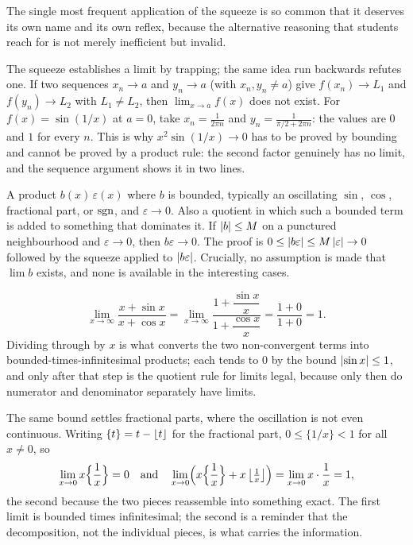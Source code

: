 The single most frequent application of the squeeze is so common that it deserves its own name and its own reflex, because the alternative reasoning that students reach for is not merely inefficient but invalid.

\begin{keynote}
The squeeze establishes a limit by trapping; the same idea run backwards refutes one. If two sequences $x_{n}\to a$ and $y_{n}\to a$ (with $x_{n},y_{n}\neq a$) give $f(x_{n})\to L_{1}$ and $f(y_{n})\to L_{2}$ with $L_{1}\neq L_{2}$, then $\lim_{x\to a}f(x)$ does not exist. For $f(x)=\sin(1/x)$ at $a=0$, take $x_{n}=\tfrac{1}{2\pi n}$ and $y_{n}=\tfrac{1}{\pi/2+2\pi n}$: the values are $0$ and $1$ for every $n$. This is why $x^{2}\sin(1/x)\to0$ has to be proved by bounding and cannot be proved by a product rule: the second factor genuinely has no limit, and the sequence argument shows it in two lines.
\end{keynote}

\cue A product $b(x)\,\varepsilon(x)$ where $b$ is bounded, typically an oscillating $\sin$, $\cos$, fractional part, or $\operatorname{sgn}$, and $\varepsilon\to0$. Also a quotient in which such a bounded term is added to something that dominates it.
\method If $\left\lvert b\right\rvert\leq M$ on a punctured neighbourhood and $\varepsilon\to0$, then $b\varepsilon\to0$. The proof is $0\leq\left\lvert b\varepsilon\right\rvert\leq M\left\lvert \varepsilon\right\rvert\to0$ followed by the squeeze applied to $\left\lvert b\varepsilon\right\rvert$. Crucially, no assumption is made that $\lim b$ exists, and none is available in the interesting cases.

\begin{worked}
\[\lim_{x\to\infty}\frac{x+\sin x}{x+\cos x}=\lim_{x\to\infty}\frac{1+\dfrac{\sin x}{x}}{1+\dfrac{\cos x}{x}}=\frac{1+0}{1+0}=1 .\]
Dividing through by $x$ is what converts the two non-convergent terms into bounded-times-infinitesimal products; each tends to $0$ by the bound $\left\lvert \sin x\right\rvert\leq1$, and only after that step is the quotient rule for limits legal, because only then do numerator and denominator separately have limits.

The same bound settles fractional parts, where the oscillation is not even continuous. Writing $\{t\}=t-\left\lfloor t\right\rfloor$ for the fractional part, $0\leq\{1/x\}<1$ for all $x\neq0$, so
\[\lim_{x\to0}x\Bigl\{\frac1x\Bigr\}=0\quad\text{and}\quad \lim_{x\to0}\Bigl(x\Bigl\{\frac1x\Bigr\}+x\left\lfloor \tfrac1x\right\rfloor\Bigr)=\lim_{x\to0}x\cdot\frac1x=1,\]
the second because the two pieces reassemble into something exact. The first limit is bounded times infinitesimal; the second is a reminder that the decomposition, not the individual pieces, is what carries the information.
\end{worked}

